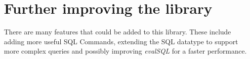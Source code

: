 \documentclass[11pt]{article}
\begin{document}
\section{Further improving the library}
\label{Further improving the library}
There are many features that could be added to this library. These include adding more useful SQL Commands,
extending the SQL datatype to support more complex queries and possibly improving \emph{evalSQL}
for a faster performance.
\end{document}
